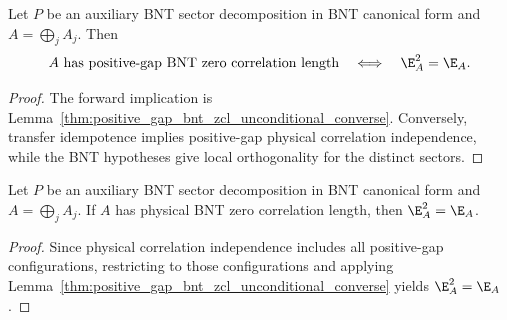 \begin{lemma}
    \label{thm:positive_gap_bnt_zcl_multiplicity_one_iff_rfp}
    \leanok
    Let $P$ be an auxiliary BNT sector decomposition in BNT canonical form and
    $A=\bigoplus_j A_j$. Then
    \begin{align}
        A\text{ has positive-gap BNT zero correlation length}
        \quad\Longleftrightarrow\quad
        \E_A^2=\E_A.
        \notag
    \end{align}
\end{lemma}
\begin{proof}\leanok
    The forward implication is
    Lemma~\ref{thm:positive_gap_bnt_zcl_unconditional_converse}.
    Conversely, transfer idempotence implies positive-gap physical
    correlation independence, while the BNT hypotheses give local
    orthogonality for the distinct sectors.
\end{proof}

\begin{lemma}
    \label{thm:physical_bnt_zcl_multiplicity_one_implies_rfp}
    \leanok
    Let $P$ be an auxiliary BNT sector decomposition in BNT canonical form and
    $A=\bigoplus_j A_j$. If $A$ has physical BNT zero correlation length,
    then $\E_A^2=\E_A$.
\end{lemma}
\begin{proof}\leanok
    Since physical correlation independence includes all positive-gap
    configurations, restricting to those configurations and applying
    Lemma~\ref{thm:positive_gap_bnt_zcl_unconditional_converse} yields
    $\E_A^2=\E_A$.
\end{proof}

